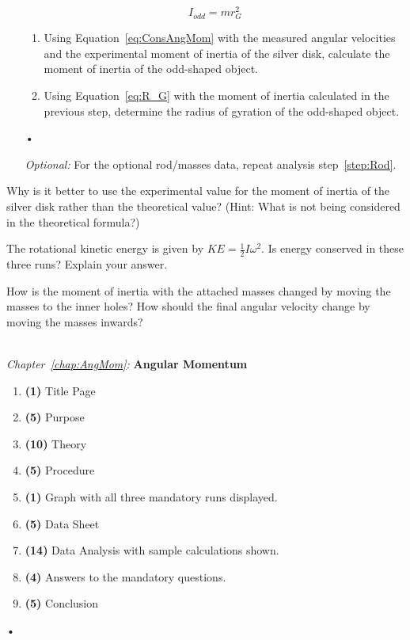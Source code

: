 \documentclass[main.tex]{subfiles}
\begin{document}
\begin{enumerate}
\begin{equation} \label{eq:R_G}
I_{odd}=mr_G^2
\end{equation}
\begin{enumerate}
\item
Using Equation~\eqref{eq:ConsAngMom} with the measured angular velocities and the experimental moment of inertia of the silver disk, calculate the moment of inertia of the odd-shaped object.
\item
Using Equation~\eqref{eq:R_G} with the moment of inertia calculated in the previous step, determine the radius of gyration of the odd-shaped object.
\end{enumerate}•
\item[\emph{Optional:}]
For the optional rod/masses data, repeat analysis step~\ref{step:Rod}.
\end{enumerate}

\begin{question}
Why is it better to use the experimental value for the moment of inertia of the silver disk rather than the theoretical value? (Hint: What is not being considered in the theoretical formula?)
\end{question}
\begin{question}
The rotational kinetic energy is given by $KE=\frac{1}{2}I\omega^2.$ Is energy conserved in these three runs? Explain your answer.
\end{question}
\begin{question}
How is the moment of inertia with the attached masses changed by moving the masses to the inner holes? How should the final angular velocity change by moving the masses inwards?
\end{question}

\begin{samepage}
\hrulefill \\
\emph{Chapter~\ref{chap:AngMom}:} \textbf{Angular Momentum}
\begin{enumerate}
\item
\textbf{(1)} Title Page
\item
\textbf{(5)} Purpose
\item
\textbf{(10)} Theory
\item
\textbf{(5)} Procedure
\item
\textbf{(1)} Graph with all three mandatory runs displayed.
\item
\textbf{(5)} Data Sheet
\item
\textbf{(14)} Data Analysis with sample calculations shown.
\item
\textbf{(4)} Answers to the mandatory questions.
\item
\textbf{(5)} Conclusion
\end{enumerate}•
\end{samepage}
\end{document}
